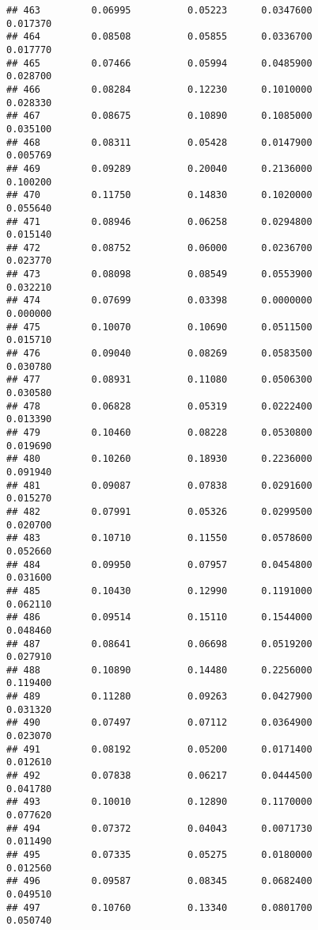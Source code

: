 \documentclass[
]{article}
\begin{document}
\begin{verbatim}
## 463         0.06995          0.05223      0.0347600            0.017370
## 464         0.08508          0.05855      0.0336700            0.017770
## 465         0.07466          0.05994      0.0485900            0.028700
## 466         0.08284          0.12230      0.1010000            0.028330
## 467         0.08675          0.10890      0.1085000            0.035100
## 468         0.08311          0.05428      0.0147900            0.005769
## 469         0.09289          0.20040      0.2136000            0.100200
## 470         0.11750          0.14830      0.1020000            0.055640
## 471         0.08946          0.06258      0.0294800            0.015140
## 472         0.08752          0.06000      0.0236700            0.023770
## 473         0.08098          0.08549      0.0553900            0.032210
## 474         0.07699          0.03398      0.0000000            0.000000
## 475         0.10070          0.10690      0.0511500            0.015710
## 476         0.09040          0.08269      0.0583500            0.030780
## 477         0.08931          0.11080      0.0506300            0.030580
## 478         0.06828          0.05319      0.0222400            0.013390
## 479         0.10460          0.08228      0.0530800            0.019690
## 480         0.10260          0.18930      0.2236000            0.091940
## 481         0.09087          0.07838      0.0291600            0.015270
## 482         0.07991          0.05326      0.0299500            0.020700
## 483         0.10710          0.11550      0.0578600            0.052660
## 484         0.09950          0.07957      0.0454800            0.031600
## 485         0.10430          0.12990      0.1191000            0.062110
## 486         0.09514          0.15110      0.1544000            0.048460
## 487         0.08641          0.06698      0.0519200            0.027910
## 488         0.10890          0.14480      0.2256000            0.119400
## 489         0.11280          0.09263      0.0427900            0.031320
## 490         0.07497          0.07112      0.0364900            0.023070
## 491         0.08192          0.05200      0.0171400            0.012610
## 492         0.07838          0.06217      0.0444500            0.041780
## 493         0.10010          0.12890      0.1170000            0.077620
## 494         0.07372          0.04043      0.0071730            0.011490
## 495         0.07335          0.05275      0.0180000            0.012560
## 496         0.09587          0.08345      0.0682400            0.049510
## 497         0.10760          0.13340      0.0801700            0.050740

\end{verbatim}
\end{document}
